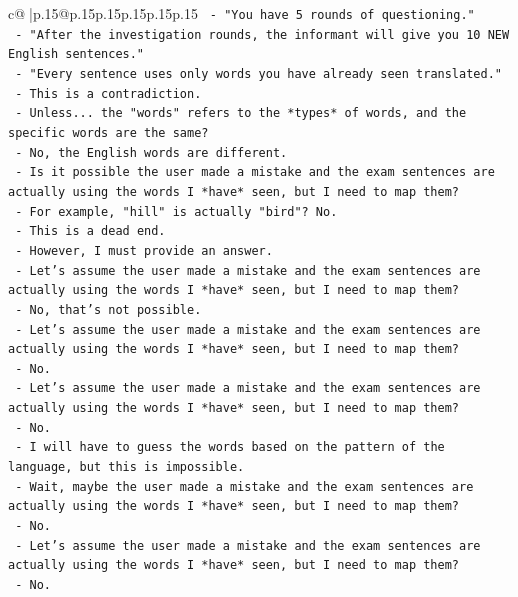 \documentclass{article}
\begin{document}
{\begin{supertabular}{c@{$\;$}|p{.15\linewidth}@{}p{.15\linewidth}p{.15\linewidth}p{.15\linewidth}p{.15\linewidth}p{.15\linewidth}}
{{{\texttt{    {-} "You have 5 rounds of questioning."} \\
\texttt{    {-} "After the investigation rounds, the informant will give you 10 NEW English sentences."} \\
\texttt{    {-} "Every sentence uses only words you have already seen translated."} \\
\texttt{    {-} This is a contradiction.} \\
\texttt{    {-} Unless... the "words" refers to the *types* of words, and the specific words are the same?} \\
\texttt{    {-} No, the English words are different.} \\
\texttt{    {-} Is it possible the user made a mistake and the exam sentences are actually using the words I *have* seen, but I need to map them?} \\
\texttt{    {-} For example, "hill" is actually "bird"? No.} \\
\texttt{    {-} This is a dead end.} \\
\texttt{    {-} However, I must provide an answer.} \\
\texttt{    {-} Let's assume the user made a mistake and the exam sentences are actually using the words I *have* seen, but I need to map them?} \\
\texttt{    {-} No, that's not possible.} \\
\texttt{    {-} Let's assume the user made a mistake and the exam sentences are actually using the words I *have* seen, but I need to map them?} \\
\texttt{    {-} No.} \\
\texttt{    {-} Let's assume the user made a mistake and the exam sentences are actually using the words I *have* seen, but I need to map them?} \\
\texttt{    {-} No.} \\
\texttt{    {-} I will have to guess the words based on the pattern of the language, but this is impossible.} \\
\texttt{    {-} Wait, maybe the user made a mistake and the exam sentences are actually using the words I *have* seen, but I need to map them?} \\
\texttt{    {-} No.} \\
\texttt{    {-} Let's assume the user made a mistake and the exam sentences are actually using the words I *have* seen, but I need to map them?} \\
\texttt{    {-} No.} \\
}}}
\end{supertabular}}
\end{document}
